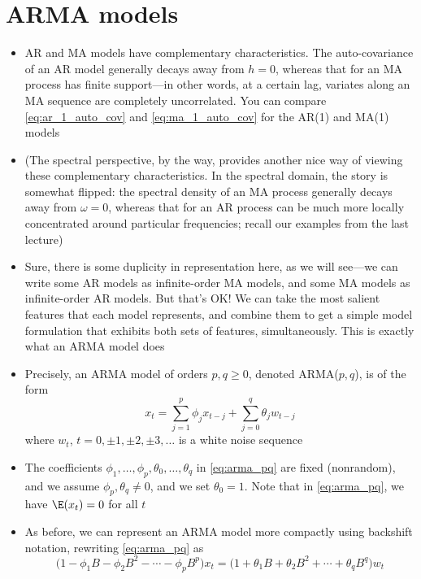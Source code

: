 \documentclass{article}
\begin{document}
\section{ARMA models}

\begin{itemize}
\item AR and MA models have complementary characteristics. The auto-covariance
  of an AR model generally decays away from $h=0$, whereas that for an MA
  process has finite support---in other words, at a certain lag, variates along
  an MA sequence are completely uncorrelated. You can compare
  \eqref{eq:ar_1_auto_cov} and \eqref{eq:ma_1_auto_cov} for the AR(1) and MA(1)
  models

\item (The spectral perspective, by the way, provides another nice way of
  viewing these complementary characteristics. In the spectral domain, the story
  is somewhat flipped: the spectral density of an MA process generally decays
  away from $\omega=0$, whereas that for an AR process can be much more locally
  concentrated around particular frequencies; recall our examples from the last
  lecture) 

\item Sure, there is some duplicity in representation here, as we will see---we
  can write some AR models as infinite-order MA models, and some MA models as  
  infinite-order AR models. But that's OK! We can take the most salient features
  that each model represents, and combine them to get a simple model formulation
  that exhibits both sets of features, simultaneously. This is exactly what an
  ARMA model does       

\item Precisely, an ARMA model of orders $p,q \geq 0$, denoted ARMA($p,q$), is
  of the form 
  \begin{equation}
  \label{eq:arma_pq}
  x_t = \sum_{j=1}^p \phi_j x_{t-j} + \sum_{j=0}^q \theta_j w_{t-j}  
  \end{equation}
  where $w_t$, $t = 0, \pm 1, \pm 2, \pm 3, \dots$ is a white noise sequence 

\item The coefficients $\phi_1,\dots,\phi_p,\theta_0,\dots,\theta_q$ in
  \eqref{eq:arma_pq} are fixed (nonrandom), and we assume $\phi_p,\theta_q \not=
  0$, and we set $\theta_0 = 1$. Note that in \eqref{eq:arma_pq}, we have
  $\E(x_t) = 0$ for all $t$ 

\item As before, we can represent an ARMA model more compactly using backshift 
  notation, rewriting \eqref{eq:arma_pq} as
  \begin{equation}
  \label{eq:arma_pq_backshift}
  \Big(1 - \phi_1 B - \phi_2 B^2 - \cdots - \phi_p B^p \Big) x_t = 
  \Big(1 + \theta_1 B + \theta_2 B^2 + \cdots + \theta_q B^q \Big) w_t   
  \end{equation}


\end{itemize}
\end{document}
